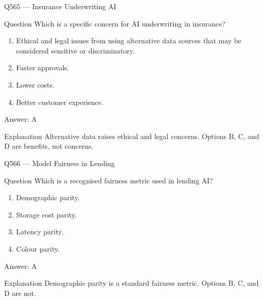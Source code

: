 \documentclass[aspectratio=169,8pt]{beamer}
\begin{document}
	\begin{frame}{Q565 --- Insurance Underwriting AI}
		\begin{block}{Question}
			Which is a specific concern for AI underwriting in insurance?
			\begin{enumerate}
				\item Ethical and legal issues from using alternative data sources that may be considered sensitive or discriminatory.
				\item Faster approvals.
				\item Lower costs.
				\item Better customer experience.
			\end{enumerate}
		\end{block}
		\begin{exampleblock}{Answer: A}\end{exampleblock}
		\begin{block}{Explanation}
			Alternative data raises ethical and legal concerns. Options B, C, and D are benefits, not concerns.
		\end{block}
	\end{frame}
	
	\begin{frame}{Q566 --- Model Fairness in Lending}
		\begin{block}{Question}
			Which is a recognised fairness metric used in lending AI?
			\begin{enumerate}
				\item Demographic parity.
				\item Storage cost parity.
				\item Latency parity.
				\item Colour parity.
			\end{enumerate}
		\end{block}
		\begin{exampleblock}{Answer: A}\end{exampleblock}
		\begin{block}{Explanation}
			Demographic parity is a standard fairness metric. Options B, C, and D are not.
		\end{block}
	\end{frame}
	
\end{document}
